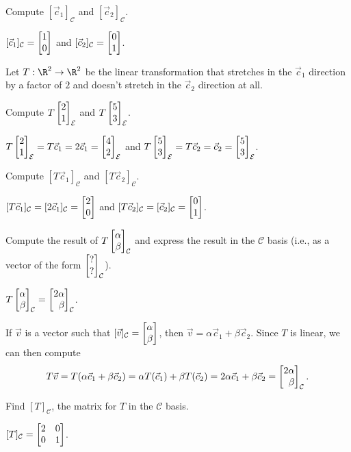 	\begin{parts}
		\item Compute $[\vec c_1]_{\mathcal C}$ and $[\vec c_2]_{\mathcal C}$.
			\begin{solution}[inline]
				$[\vec c_1]_{\mathcal C}=\mat{1\\0}$ and
				$[\vec c_2]_{\mathcal C}=\mat{0\\1}$.
			\end{solution}
	\end{parts}
	Let $T:\R^2\to\R^2$ be the linear transformation that stretches in the $\vec c_1$ direction by a factor of $2$
	and doesn't stretch in the $\vec c_2$ direction at all.
	\begin{parts}[resume]
		\item Compute $T\mat{2\\1}_{\mathcal E}$ and $T\mat{5\\3}_{\mathcal E}$.
			\begin{solution}[inline]
				$T\mat{2\\1}_{\mathcal E}=T\vec c_1=2\vec c_1=\mat{4\\2}_{\mathcal E}$ and
				$T\mat{5\\3}_{\mathcal E}=T\vec c_2=\vec c_2=\mat{5\\3}_{\mathcal E}$.
			\end{solution}
		\item Compute $[T\vec c_1]_{\mathcal C}$ and $[T\vec c_2]_{\mathcal C}$.
			\begin{solution}[inline]
				$[T\vec c_1]_{\mathcal C}=[2\vec c_1]_{\mathcal C}=\mat{2\\0}$ and
				$[T\vec c_2]_{\mathcal C}=[\vec c_2]_{\mathcal C}=\mat{0\\1}$.
			\end{solution}
		\item Compute the result of $T\mat{\alpha\\\beta}_{\mathcal C}$ and express the result in the
			$\mathcal C$ basis (i.e., as a vector of the form $\mat{?\\?}_{\mathcal C}$).
			\begin{solution}
				$T\mat{\alpha\\\beta}_{\mathcal C}=\mat{2\alpha\\\beta}_{\mathcal C}$.

				If $\vec v$ is a vector such that
				$[\vec v]_{\mathcal C}=\mat{\alpha\\\beta}$, then
				$\vec v=\alpha\vec c_1+\beta\vec c_2$. Since $T$ is linear, we can
				then compute
				\[
					T\vec v
					=T(\alpha\vec c_1+\beta\vec c_2)
					=\alpha T(\vec c_1)+\beta T(\vec c_2)
					=2\alpha\vec c_1+\beta\vec c_2
					=\mat{2\alpha\\\beta}_{\mathcal C}.
				\]
			\end{solution}
		\item Find $[T]_{\mathcal C}$, the matrix for $T$ in the $\mathcal C$ basis.
			\begin{solution}
				$[T]_{\mathcal C}=\mat{2&0\\0&1}$.


\end{solution}
\end{parts}
